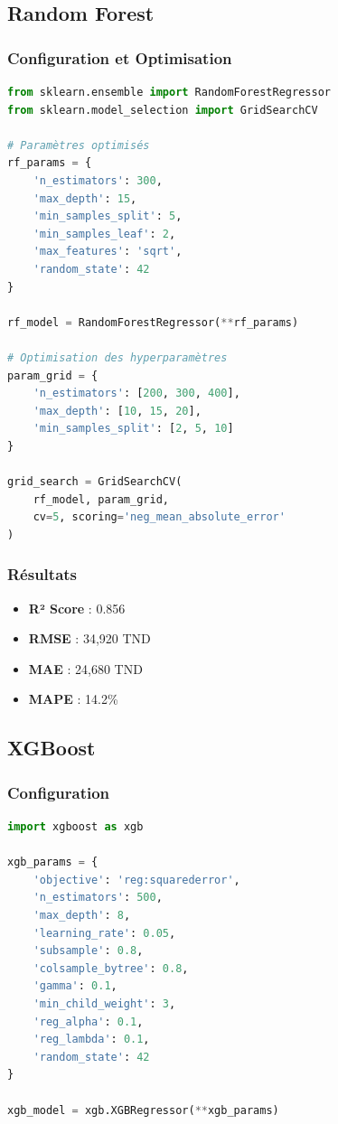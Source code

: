 \subsection{Random Forest}

\subsubsection{Configuration et Optimisation}
\begin{lstlisting}[language=Python, caption=Configuration optimisée de Random Forest]
from sklearn.ensemble import RandomForestRegressor
from sklearn.model_selection import GridSearchCV

# Paramètres optimisés
rf_params = {
    'n_estimators': 300,
    'max_depth': 15,
    'min_samples_split': 5,
    'min_samples_leaf': 2,
    'max_features': 'sqrt',
    'random_state': 42
}

rf_model = RandomForestRegressor(**rf_params)

# Optimisation des hyperparamètres
param_grid = {
    'n_estimators': [200, 300, 400],
    'max_depth': [10, 15, 20],
    'min_samples_split': [2, 5, 10]
}

grid_search = GridSearchCV(
    rf_model, param_grid, 
    cv=5, scoring='neg_mean_absolute_error'
)
\end{lstlisting}

\subsubsection{Résultats}
\begin{itemize}
    \item \textbf{R² Score} : 0.856
    \item \textbf{RMSE} : 34,920 TND
    \item \textbf{MAE} : 24,680 TND
    \item \textbf{MAPE} : 14.2\%
\end{itemize}

\subsection{XGBoost}

\subsubsection{Configuration}
\begin{lstlisting}[language=Python, caption=Configuration optimisée de XGBoost]
import xgboost as xgb

xgb_params = {
    'objective': 'reg:squarederror',
    'n_estimators': 500,
    'max_depth': 8,
    'learning_rate': 0.05,
    'subsample': 0.8,
    'colsample_bytree': 0.8,
    'gamma': 0.1,
    'min_child_weight': 3,
    'reg_alpha': 0.1,
    'reg_lambda': 0.1,
    'random_state': 42
}

xgb_model = xgb.XGBRegressor(**xgb_params)
\end{lstlisting}

